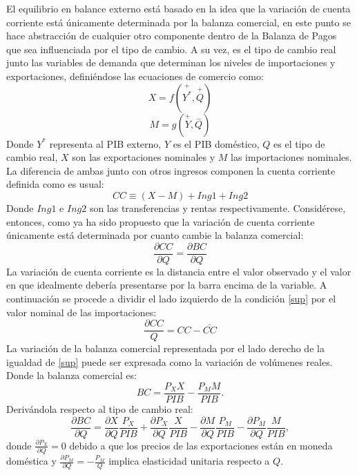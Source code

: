 \documentclass[12pt,letterpaper]{article}
\begin{document}
El equilibrio en balance externo está basado en la idea que la variación de cuenta corriente está únicamente determinada por la balanza comercial, en este punto se hace abstracción de cualquier otro componente dentro de la Balanza de Pagos que sea influenciada por el tipo de cambio. A su vez, es el tipo de cambio real junto las variables de demanda que determinan los niveles de importaciones y exportaciones, definiéndose las ecuaciones de comercio como:
\begin{equation}\label{X}
X=f(\overset{+}{Y^*},\overset{+}{Q})
\end{equation}
\begin{equation}\label{M}
M=g(\overset{+}{Y},\overset{-}{Q})
\end{equation}
Donde $Y^*$ representa al PIB externo, $Y$ es el PIB doméstico, $Q$ es el tipo de cambio real, $X$ son las exportaciones nominales y $M$ las importaciones nominales.
La diferencia de ambas junto con otros ingresos componen la cuenta corriente definida como es usual:
\begin{equation}\label{CC}
CC\equiv(X-M)+Ing1+Ing2
\end{equation}
Donde $Ing1$ e $Ing2$ son las transferencias y rentas respectivamente.
Considérese, entonces, como ya ha sido propuesto que la variación de cuenta corriente únicamente está determinada por cuanto cambie la balanza comercial:
\begin{equation}\label{sup}
\frac{\partial CC}{\partial Q}=\frac{\partial BC}{\partial Q}
\end{equation}
La variación de cuenta corriente es la distancia entre el valor observado y el valor en que idealmente debería presentarse por la barra encima de la variable. A continuación se procede a dividir el lado izquierdo de la condición \ref{sup} por el valor nominal de las importaciones:
\begin{equation}\label{dcc}
\frac{\partial CC}{Q}=CC-\bar{CC}
\end{equation}
La variación de la balanza comercial representada por el lado derecho de la igualdad de \ref{sup} puede ser expresada como la variación de volúmenes reales. Donde la balanza comercial es:
\begin{equation}
BC=\frac{P_X X}{PIB}-\frac{P_M M}{PIB}.
\end{equation}
Derivándola respecto al tipo de cambio real:
\begin{equation}
\frac{\partial BC}{\partial Q}=\frac{\partial X}{\partial Q} \frac{P_X}{PIB}+\frac{\partial P_X}{\partial Q} \frac{X}{PIB} - \frac{\partial M}{\partial Q} \frac{P_M}{PIB}-\frac{\partial P_M}{\partial Q}\frac{M}{PIB},
\end{equation}
donde $\frac{\partial P_X}{\partial Q}=0$ debido a que los precios de las exportaciones están en moneda doméstica y $\frac{\partial P_M}{\partial Q}=-\frac{P_M}{Q}$ implica elasticidad unitaria respecto a $Q$.
\end{document}
